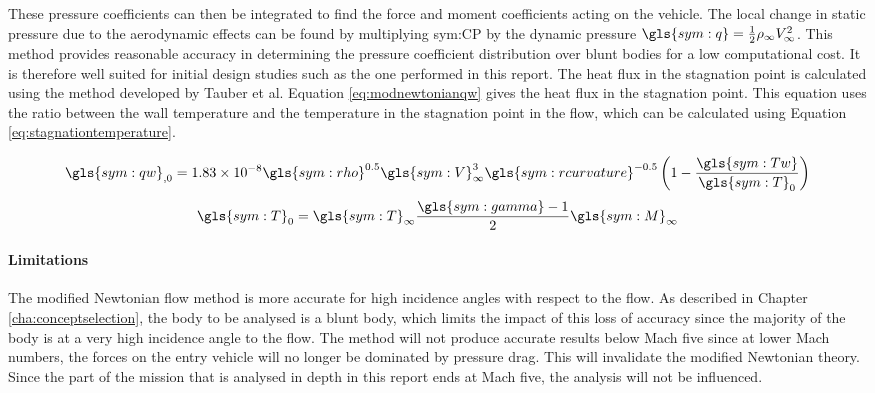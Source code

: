These pressure coefficients can then be integrated to find the force and moment coefficients acting on the vehicle. The local change in static pressure due to the aerodynamic effects can be found by multiplying \gls{sym:CP} by the dynamic pressure $\gls{sym:q}=\frac{1}{2}\rho_{\infty}V_{\infty}^{2}$. This method provides reasonable accuracy in determining the pressure coefficient distribution over blunt bodies for a low computational cost. It is therefore well suited for initial design studies such as the one performed in this report\cite{AndersonJr.2006}.
The heat flux in the stagnation point is calculated using the method developed by Tauber et al. Equation \ref{eq:modnewtonianqw} gives the heat flux in the stagnation point. This equation uses the ratio between the wall temperature and the temperature in the stagnation point in the flow, which can be calculated using Equation \ref{eq:stagnationtemperature}\cite{AndersonJr.2006}.

	\begin{equation} \label{eq:modnewtonianqw}
		\gls{sym:qw}_{,0} = 1.83 \times 10^{-8} \gls{sym:rho}^{0.5} \gls{sym:V}_{\infty}^3  \gls{sym:rcurvature}^{-0.5} \left(1-\frac{\gls{sym:Tw}}{\gls{sym:T}_0}\right)
	\end{equation} \break
	\begin{equation}
		\gls{sym:T}_0 = \gls{sym:T}_\infty \frac{\gls{sym:gamma}-1}{2}\gls{sym:M}_\infty
		\label{eq:stagnationtemperature}
	\end{equation}
	


\paragraph{Limitations}
The modified Newtonian flow method is more accurate for high incidence angles with respect to the flow\cite{AndersonJr.2006}. As described in Chapter \ref{cha:conceptselection}, the body to be analysed is a blunt body, which limits the impact of this loss of accuracy since the majority of the body is at a very high incidence angle to the flow. The method will not produce accurate results below Mach five since at lower Mach numbers, the forces on the entry vehicle will no longer be dominated by pressure drag. This will invalidate the modified Newtonian theory\cite{AndersonJr.2006}.
Since the part of the mission that is analysed in depth in this report ends at Mach five, the analysis will not be influenced.

